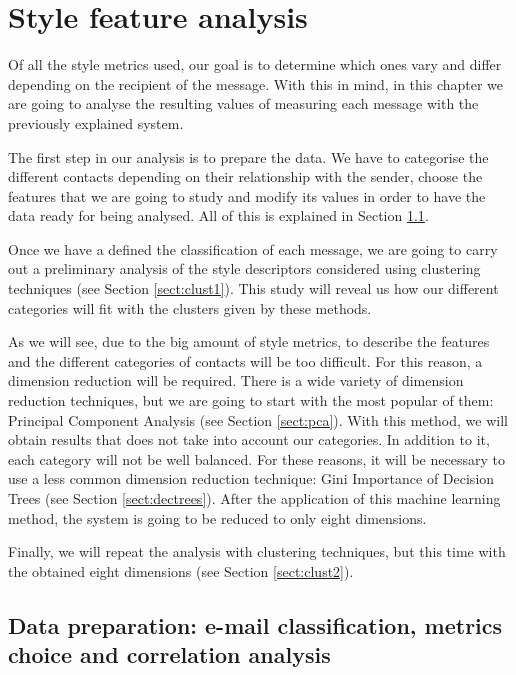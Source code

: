 \chapter{Style feature analysis}\label{cap:analysis}


Of all the style metrics used, our goal is to determine which ones vary and differ depending on the recipient of the message. With this in mind, in this chapter we are going to analyse the resulting values of measuring each message with the previously explained system.

The first step in our analysis is to prepare the data. We have to categorise the different contacts depending on their relationship with the sender, choose the features that we are going to study and modify its values in order to have the data ready for being analysed. All of this is explained in Section \ref{sect:DatPrep}.

Once we have a defined the classification of each message, we are going to carry out a preliminary analysis of the style descriptors considered using clustering techniques (see Section \ref{sect:clust1}). This study will reveal us how our different categories will fit with the clusters given by these methods.

As we will see, due to the big amount of style metrics, to describe the features and the different categories of contacts will be too difficult. For this reason, a dimension reduction will be required. There is a wide variety of dimension reduction techniques, but we are going to start with the most popular of them: Principal Component Analysis (see Section \ref{sect:pca}). With this method, we will obtain results that does not take into account our categories. In addition to it, each category will not be well balanced. For these reasons, it will be necessary to use a less common dimension reduction technique: Gini Importance of Decision Trees (see Section \ref{sect:dectrees}). After the application of this machine learning method, the system is going to be reduced to only eight dimensions.

Finally, we will repeat the analysis with clustering techniques, but this time with the obtained eight dimensions (see Section \ref{sect:clust2}).

\section{Data preparation: e-mail classification, metrics choice and correlation analysis}\label{sect:DatPrep}



